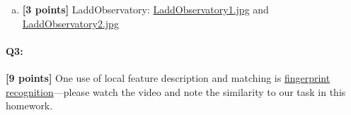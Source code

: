 \documentclass[11pt]{article}
\begin{document}
\begin{enumerate}[(a)]
    
    \pagebreak
    \item \textbf{[3 points]} 
    LaddObservatory: 
    \href{images/LaddObservatory1.jpg}{LaddObservatory1.jpg} and \href{images/LaddObservatory2.jpg}{LaddObservatory2.jpg}
\end{enumerate}


\pagebreak
\paragraph{Q3:} \textbf{[9 points]} One use of local feature description and matching is \href{https://www.youtube.com/watch?v=xD88Qs_DZp4}{fingerprint recognition}---please watch the video and note the similarity to our task in this homework. 
\end{document}
